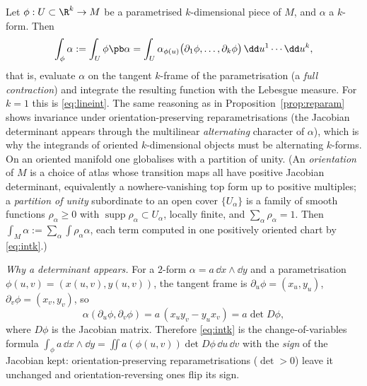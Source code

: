 Let $\phi:U\subset\R^k\to M$ be a parametrised $k$-dimensional piece of $M$, and $\alpha$ a $k$-form. Then
\begin{equation}\label{eq:intk}
\int_\phi\alpha:=\int_U\phi\pb\alpha=\int_U\alpha_{\phi(u)}\bigl(\partial_1\phi,\dots,\partial_k\phi\bigr)\,\dd u^1\cdots\dd u^k,
\end{equation}
that is, evaluate $\alpha$ on the tangent $k$-frame of the parametrisation (a \emph{full contraction}) and integrate the resulting function with the Lebesgue measure. For $k=1$ this is \eqref{eq:lineint}.
The same reasoning as in Proposition~\ref{prop:reparam} shows invariance under orientation-preserving reparametrisations (the Jacobian determinant appears through the multilinear \emph{alternating} character of $\alpha$), which is why the integrands of oriented $k$-dimensional objects must be alternating $k$-forms. On an oriented manifold one globalises with a partition of unity.
(An \emph{orientation} of $M$ is a choice of atlas whose transition maps all have positive Jacobian determinant, equivalently a
nowhere-vanishing top form up to positive multiples; a \emph{partition of unity} subordinate to an open cover $\{U_\alpha\}$ is a family of
smooth functions $\rho_\alpha\ge0$ with $\operatorname{supp}\rho_\alpha\subset U_\alpha$, locally finite, and $\sum_\alpha\rho_\alpha=1$.
Then $\int_M\alpha:=\sum_\alpha\int\rho_\alpha\alpha$, each term computed in one positively oriented chart by \eqref{eq:intk}.)

\emph{Why a determinant appears.} For a $2$-form $\alpha=a\,\dd x\wedge\dd y$ and a parametrisation $\phi(u,v)=(x(u,v),y(u,v))$, the tangent frame is $\partial_u\phi=(x_u,y_u)$, $\partial_v\phi=(x_v,y_v)$, so
\[
\alpha(\partial_u\phi,\partial_v\phi)=a\,(x_uy_v-y_ux_v)=a\det D\phi,
\]
where $D\phi$ is the Jacobian matrix. Therefore \eqref{eq:intk} is the change-of-variables formula $\int_\phi a\,\dd x\wedge\dd y=\iint a(\phi(u,v))\det D\phi\,\dd u\,\dd v$ with the \emph{sign} of the Jacobian kept: orientation-preserving reparametrisations ($\det>0$) leave it unchanged and orientation-reversing ones flip its sign.

